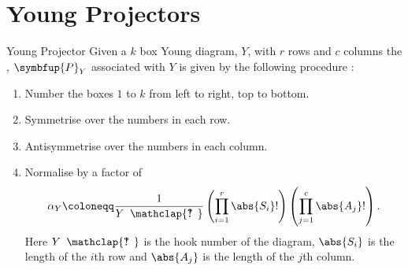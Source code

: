 \documentclass[fleqn]{NotesClass}
\newcommand{\projector}[1]{\symbfup{P}_{#1}}
\newcommand{\hooknumber}[1]{#1{\phantom{?}\mkern1mu\mathclap{\ooalign{\hfil ? \hfil \cr \hfil ! \hfil}}}}
\begin{document}
    \section{Young Projectors}
    \begin{dfn}{Young Projector}{}
        Given a \(k\) box Young diagram, \(Y\), with \(r\) rows and \(c\) columns the , \(\projector{Y}\) associated with \(Y\) is given by the following procedure \cite[91]{cvitanovic}:
        \begin{enumerate}
            \item Number the boxes \(1\) to \(k\) from left to right, top to bottom.
            \item Symmetrise over the numbers in each row.
            \item Antisymmetrise over the numbers in each column.
            \item Normalise by a factor of
            \begin{equation}
                \alpha_Y \coloneqq \frac{1}{\hooknumber{Y}} \left( \prod_{i=1}^{r} \abs{S_i}! \right) \left( \prod_{j=1}^{c} \abs{A_j}! \right).
            \end{equation}
            Here \(\hooknumber{Y}\) is the hook number of the diagram, \(\abs{S_i}\) is the length of the \(i\)th row and \(\abs{A_j}\) is the length of the \(j\)th column.
        \end{enumerate}
    \end{dfn}
    
\end{document}
